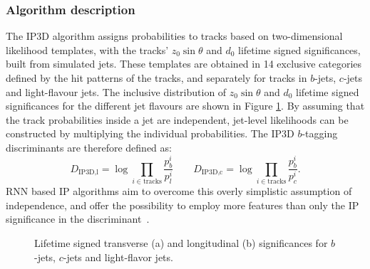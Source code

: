 \subsubsection{Algorithm description}



The IP3D algorithm \cite{FTAG-2018-01} assigns probabilities to tracks based on two-dimensional likelihood templates, with the tracks' $z_0\sin\theta$ and $d_0$ lifetime signed significances, built from simulated jets.
These templates are obtained in 14 exclusive categories defined by the hit patterns of the tracks, and separately for tracks in $b$-jets, $c$-jets and light-flavour jets. 
The inclusive distribution of $z_0\sin\theta$ and $d_0$ lifetime signed significances for the different jet flavours are shown in Figure \ref{fig:flippedInputs}.
By assuming that the track probabilities inside a jet are independent, jet-level likelihoods can be constructed by multiplying the individual probabilities.
The IP3D $b$-tagging discriminants are therefore defined as:
\begin{equation}
D_{\text{IP3D,l}} = \log \prod_{i \in \text{tracks}} \frac{p_b^i}{p_l^{i}} \qquad D_{\text{IP3D,c}} = \log \prod_{i \in \text{tracks}} \frac{p_b^i}{p_c^{i}}.
\end{equation}
RNN based IP algorithms aim to overcome this overly simplistic assumption of independence, and offer the possibility to employ more features than only the IP significance in the discriminant~\cite{ATL-PHYS-PUB-2017-003}. 

\def\figpath{figures/ftag/dips-note/}
\begin{figure}[htbp]
  \centering
  \caption{Lifetime signed transverse (a) and longitudinal (b) significances for $b$-jets, $c$-jets and light-flavor jets.}
  \label{fig:flippedInputs}
\end{figure}






